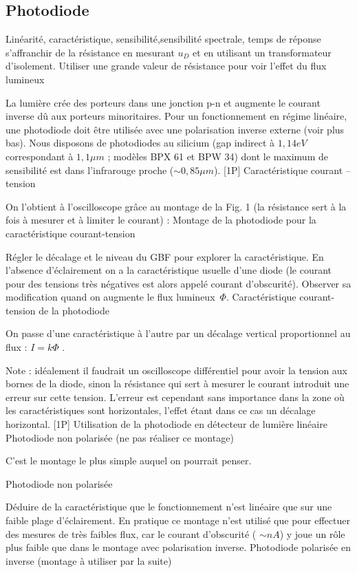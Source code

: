 \documentclass{article}%
\begin{document}
\subsection{Photodiode}

Linéarité, caractéristique, sensibilité,sensibilité spectrale, temps de réponse
s'affranchir de la résistance en mesurant $u_D$ et en utilisant un transformateur d'isolement.
Utiliser une grande valeur de résistance pour voir l'effet du flux lumineux

La lumière crée des porteurs dans une jonction p-n et augmente le courant inverse dû aux porteurs minoritaires. Pour un fonctionnement en régime linéaire, une photodiode doit être utilisée avec une polarisation inverse externe (voir plus bas). Nous disposons de photodiodes au silicium (gap indirect à $1,14 eV$ correspondant à $1,1 \mu m$ ; modèles BPX 61 et BPW 34) dont le maximum de sensibilité est dans l'infrarouge proche ($ \sim 0,85 \mu m$).
[1P] Caractéristique courant -- tension

On l'obtient à l'oscilloscope grâce au montage de la Fig. 1 (la résistance sert à la fois à mesurer et à limiter le courant) :
Montage de la photodiode pour la caractéristique courant-tension

Régler le décalage et le niveau du GBF pour explorer la caractéristique. En l'absence d'éclairement on a la caractéristique usuelle d'une diode (le courant pour des tensions très négatives est alors appelé courant d'obscurité). Observer sa modification quand on augmente le flux lumineux~$\Phi$.
Caractéristique courant-tension de la photodiode

On passe d'une caractéristique à l'autre par un décalage vertical proportionnel au flux : $ I = k \Phi$ .

Note : idéalement il faudrait un oscilloscope différentiel pour avoir la tension aux bornes de la diode, sinon la résistance qui sert à mesurer le courant introduit une erreur sur cette tension. L'erreur est cependant sans importance dans la zone où les caractéristiques sont horizontales, l'effet étant dans ce cas un décalage horizontal.
[1P] Utilisation de la photodiode en détecteur de lumière linéaire
Photodiode non polarisée (ne pas réaliser ce montage)

C'est le montage le plus simple auquel on pourrait penser.


Photodiode non polarisée

Déduire de la caractéristique que le fonctionnement n'est linéaire que sur une faible plage d'éclairement. En pratique ce montage n'est utilisé que pour effectuer des mesures de très faibles flux, car le courant d'obscurité ( $\sim nA$) y joue un rôle plus faible que dans le montage avec polarisation inverse.
Photodiode polarisée en inverse (montage à utiliser par la suite)
\end{document}
